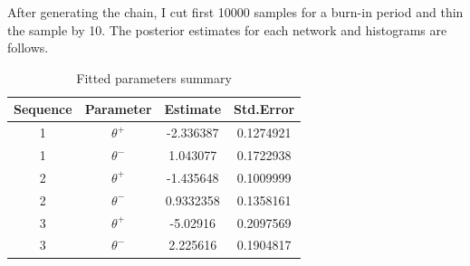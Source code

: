 \documentclass[aspectratio=169,ignorenonframetext,9pt]{beamer}
\theoremstyle{plain}
\theoremstyle{definition}
\begin{document}
After generating the chain, I cut first 10000 samples for a burn-in period and thin the sample by 10.
The posterior estimates for each network and histograms are follows.
\begin{table}[h!]
    \centering
        \begin{tabular}{c | c | c | c }
            Sequence & Parameter & Estimate & Std.Error \\
            \hline \hline
            1 & $\theta^+$ & -2.336387 & 0.1274921 \\
            1 & $\theta^-$ & 1.043077 & 0.1722938 \\
            2 & $\theta^+$ & -1.435648 & 0.1009999 \\
            2 & $\theta^-$ & 0.9332358 & 0.1358161 \\
            3 & $\theta^+$ & -5.02916 & 0.2097569 \\
            3 & $\theta^-$ & 2.225616 & 0.1904817 \\
        \end{tabular}
        \caption{Fitted parameters summary}
    \end{table}
\clearpage
\end{document}
